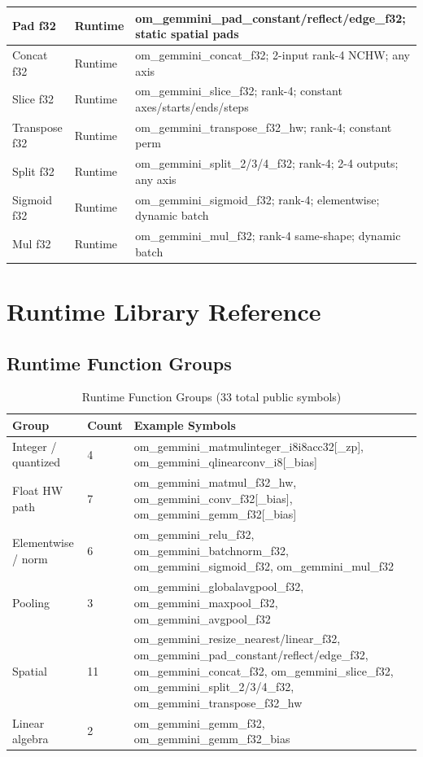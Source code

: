 \documentclass[12pt,a4paper]{article}
\begin{document}
\begin{longtable}{|p{}|p{}|p{}|}
\hline
Pad f32 & Runtime & om\_gemmini\_pad\_constant/reflect/edge\_f32; static spatial pads \\
\hline
Concat f32 & Runtime & om\_gemmini\_concat\_f32; 2-input rank-4 NCHW; any axis \\
\hline
Slice f32 & Runtime & om\_gemmini\_slice\_f32; rank-4; constant axes/starts/ends/steps \\
\hline
Transpose f32 & Runtime & om\_gemmini\_transpose\_f32\_hw; rank-4; constant perm \\
\hline
Split f32 & Runtime & om\_gemmini\_split\_2/3/4\_f32; rank-4; 2-4 outputs; any axis \\
\hline
Sigmoid f32 & Runtime & om\_gemmini\_sigmoid\_f32; rank-4; elementwise; dynamic batch \\
\hline
Mul f32 & Runtime & om\_gemmini\_mul\_f32; rank-4 same-shape; dynamic batch \\
\hline
\end{longtable}

\section{Runtime Library Reference}

\subsection{Runtime Function Groups}

\begin{table}[H]
\centering
\begin{tabular}{|p{}|p{}|p{}|}
\hline
\textbf{Group} & \textbf{Count} & \textbf{Example Symbols} \\
\hline
Integer / quantized & 4 & om\_gemmini\_matmulinteger\_i8i8acc32[\_zp], om\_gemmini\_qlinearconv\_i8[\_bias] \\
\hline
Float HW path & 7 & om\_gemmini\_matmul\_f32\_hw, om\_gemmini\_conv\_f32[\_bias], om\_gemmini\_gemm\_f32[\_bias] \\
\hline
Elementwise / norm & 6 & om\_gemmini\_relu\_f32, om\_gemmini\_batchnorm\_f32, om\_gemmini\_sigmoid\_f32, om\_gemmini\_mul\_f32 \\
\hline
Pooling & 3 & om\_gemmini\_globalavgpool\_f32, om\_gemmini\_maxpool\_f32, om\_gemmini\_avgpool\_f32 \\
\hline
Spatial & 11 & om\_gemmini\_resize\_nearest/linear\_f32, om\_gemmini\_pad\_constant/reflect/edge\_f32, om\_gemmini\_concat\_f32, om\_gemmini\_slice\_f32, om\_gemmini\_split\_2/3/4\_f32, om\_gemmini\_transpose\_f32\_hw \\
\hline
Linear algebra & 2 & om\_gemmini\_gemm\_f32, om\_gemmini\_gemm\_f32\_bias \\
\hline
\end{tabular}
\caption{Runtime Function Groups (33 total public symbols)}
\end{table}
\end{document}
